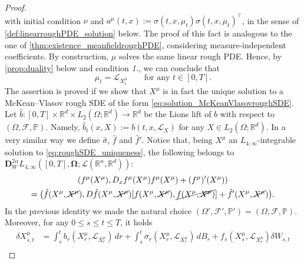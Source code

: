 \documentclass[10pt, a4paper]{article} %
\newcommand{\R}{\mathbb{R}}
\theoremstyle{definition}
\theoremstyle{plain}
\begin{document}
\begin{proof}
\begin{equation*}
    \end{equation*}
    with initial condition $\nu$ and $a^\mu(t,x) := \sigma(t,x,\mu_t) \sigma(t,x,\mu_t)^\top$, in the sense of \cref{def:linearroughPDE_solution} below. The proof of this fact is analogous to the one of \cref{thm:existence_meanfieldroughPDE}, considering measure-independent coefficients. 
    By construction, $\mu$ solves the same linear rough PDE. Hence, by \cref{prop:duality} below and condition \textit{1.}, we can conclude that \begin{equation*}
        \mu_t = \mathcal{L}_{X^\mu_t} \qquad \text{for any $t \in [0,T]$} .
    \end{equation*}
    The assertion is proved if we show that $X^\mu$ is in fact the unique solution to a McKean--Vlasov rough SDE of the form \eqref{eq:solution_McKeanVlasovroughSDE}. 
    Let $\hat{b}:[0,T] \times \R^d \times L_2(\Omega;\R^d) \to \R^d$ be the Lions lift of $b$ with respect to $(\Omega,\mathcal{F},\mathbb{P})$. Namely, $\hat b_t(x,X) := b(t, x,\mathcal{L}_X)$ for any $X \in L_2(\Omega;\R^d)$. 
    In a very similar way we define $\hat{\sigma}$, $\hat{f}$ and $\hat{f}'$.     
    Notice that, being $X^\mu$ an $L_{4,\infty}$-integrable solution to \eqref{eq:roughSDE_uniqueness}, the following belongs to $\mathbf{D}_W^{2\alpha} L_{4,\infty}([0,T] , \mathbf{\Omega} ; \mathscr{L}(\R^n,\R^d))$:  
        \begin{multline*}
        (f^\mu(X^\mu), D_x f^\mu(X^\mu) f^\mu(X^\mu) + (f^\mu)'(X^\mu)) 
         \\ 
        = \big( \hat{f}(X^\mu, \cancel{X^\mu}) , D \hat{f} (X^\mu, \cancel{X^\mu}) [f(X^\mu, \cancel{X^\mu}), \cancel{f(X^\mu, \cancel{X^\mu})}] + \hat{f}'(X^\mu, \cancel{X^\mu}) \big) .
    \end{multline*}
    In the previous identity we made the natural choice $(\Omega',\mathcal{F}',\mathbb{P}') = (\Omega, \mathcal{F}, \mathbb{P})$. 
    Moreover, for any $0 \le s \le t \le T$, it holds \begin{equation*}
        \begin{split}
            \delta X^\mu _{s,t} &= \int_s^t b_r(X^\mu_r , \mathcal{L}_{X^\mu_r}) \, dr + \int_s^t \sigma_r(X^\mu_r , \mathcal{L}_{X^\mu_r}) \, dB_r +  f_s(X^\mu_s,\mathcal{L}_{X^\mu_s}) \delta W_{s,t}  \\

\end{split}
\end{equation*}
\end{proof}
\end{document}
